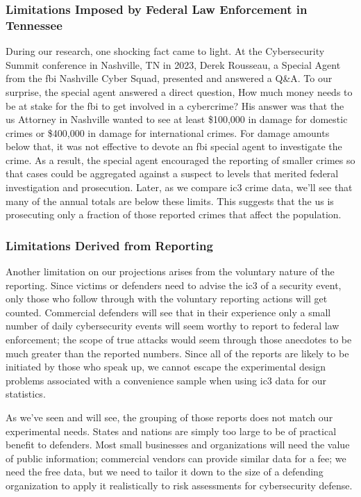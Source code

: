 \subsubsection{Limitations Imposed by Federal Law Enforcement in Tennessee}
During our research, one shocking fact came to light.  At the Cybersecurity Summit conference in Nashville, TN in 2023, Derek Rousseau, a Special Agent from the \gls{fbi} Nashville Cyber Squad, presented and answered a Q\&A.  To our surprise, the special agent answered a direct question, How much money needs to be at stake for the \gls{fbi} to get involved in a  \gls{cybercrime}?  His answer was that the \gls{us} Attorney in Nashville wanted to see at least \$100,000 in damage for domestic crimes or \$400,000 in damage for international crimes.  For damage amounts below that, it was not effective to devote an \gls{fbi} special agent to investigate the crime.  As a result, the special agent encouraged the reporting of smaller crimes so that cases could be aggregated against a suspect to levels that merited federal investigation and prosecution.  Later, as we compare \gls{ic3} crime data, we'll see that many of the annual totals are below these limits.  This suggests that the \gls{us} is prosecuting only a fraction of those reported crimes that affect the  \gls{population}.
\subsubsection{Limitations Derived from Reporting}
Another limitation on our projections arises from the voluntary nature of the reporting.  Since victims or defenders need to advise the \gls{ic3} of a security event, only those who follow through with the voluntary reporting actions will get counted.  Commercial defenders will see that in their experience only a small number of daily cybersecurity events will seem worthy to report to federal law enforcement; the scope of true attacks would seem through those anecdotes to be much greater than the reported numbers.  Since all of the reports are likely to be initiated by those who speak up, we cannot escape the experimental design problems associated with a convenience \gls{sample} when using \gls{ic3} data for our \gls{statistics}.

As we've seen and will see, the grouping of those reports does not match our experimental needs.  States and nations are simply too large to be of practical benefit to defenders.  Most small businesses and organizations will need the value of public information; commercial vendors can provide similar data for a fee; we need the free data, but we need to tailor it down to the size of a defending organization to apply it realistically to risk assessments for cybersecurity defense.

